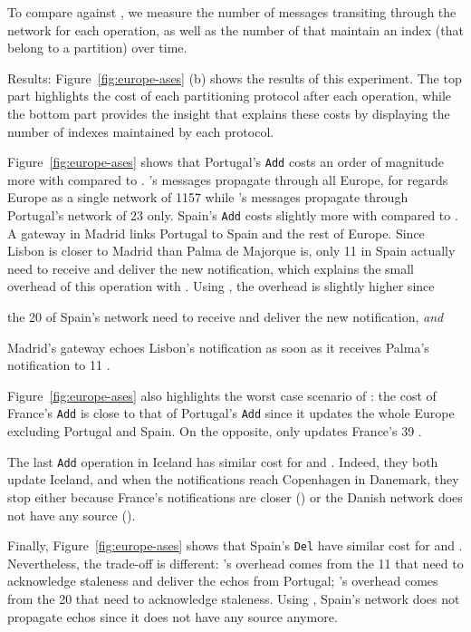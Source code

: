 \begin{asparadesc}
    \noindent To compare \NAME against \NAMEC, we measure the number of messages transiting through the
    network for each operation, as well as the number of
    \processes that maintain an index (\ie that belong to a partition)
    over time.
    
  \item[Results:] Figure~\ref{fig:europe-ases} (b) shows the
    results of this experiment. The top part highlights the cost of
    each partitioning protocol after each operation, while the bottom
    part provides the insight that explains these costs by displaying
    the number of indexes maintained by each protocol.

    \noindent Figure~\ref{fig:europe-ases} shows that Portugal's
    \texttt{Add} costs an order of magnitude more with \NAME compared
    to \NAMEC.  \NAME's messages propagate through all Europe, for
    \NAME regards Europe as a single network of 1157 \processes while
    \NAMEC's messages propagate through Portugal's network of 23
    \processes only.
    \noindent  Spain's
    \texttt{Add} costs slightly more with \NAMEC compared to \NAME.  A
    gateway in Madrid links Portugal to Spain and the rest of
    Europe. Since Lisbon is closer to Madrid than Palma de Majorque
    is, only 11 \processes in Spain actually need to receive and
    deliver the new notification, which explains the small overhead of this
    operation with \NAME. Using \NAMEC, the overhead is slightly
    higher since
    \begin{inparaenum}[(i)]
    \item the 20 \processes of Spain's network need to receive and
      deliver the new notification, \emph{and}
    \item Madrid's gateway echoes Lisbon's notification as soon as it
      receives Palma's notification to 11 \processes.
    \end{inparaenum}

    \noindent Figure~\ref{fig:europe-ases} also highlights the worst
    case scenario of \NAME: the cost of France's \texttt{Add} is close
    to that of Portugal's \texttt{Add} since it updates the whole
    Europe excluding Portugal and Spain. On the opposite, \NAMEC only
    updates France's 39 \processes.

    \noindent The last \texttt{Add} operation in Iceland has similar
    cost for \NAME and \NAMEC. Indeed, they both update Iceland, and
    when the notifications reach Copenhagen in Danemark, they stop
    either because France's notifications are closer (\NAME) or the
    Danish network does not have any source (\NAMEC).

    \noindent Finally, Figure~\ref{fig:europe-ases} shows that
    Spain's \texttt{Del} have similar cost for \NAME and
    \NAMEC. Nevertheless, the trade-off is different: \NAME's overhead
    comes from the 11 \nodes that need to acknowledge staleness and
    deliver the echos from Portugal; \NAMEC's overhead comes from the
    20 \nodes that need to acknowledge staleness. Using \NAMEC,
    Spain's network does not propagate echos since it does not have
    any source anymore.

\end{asparadesc}

